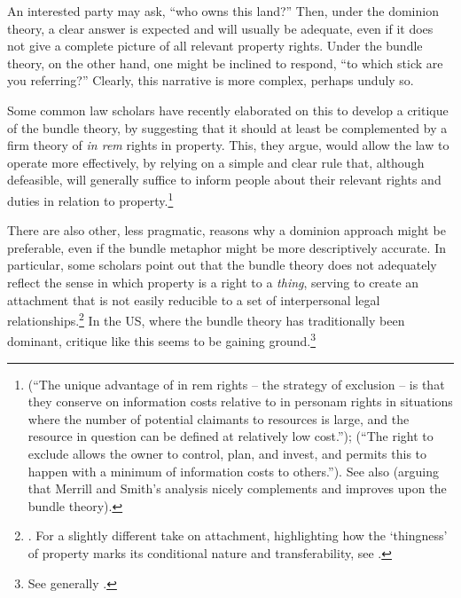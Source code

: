 An interested party may ask, ``who owns this land?'' Then, under the dominion theory, a clear answer is expected and will usually be adequate, even if it does not give a complete picture of all relevant property rights. Under the bundle theory, on the other hand, one might be inclined to respond, ``to which stick are you referring?'' Clearly, this narrative is more complex, perhaps unduly so. 

Some common law scholars have recently elaborated on this to develop a critique of the bundle theory, by suggesting that it should at least be complemented by a firm theory of {\it in rem} rights in property. This, they argue, would allow the law to operate more effectively, by relying on a simple and clear rule that, although defeasible, will generally suffice to inform people about their relevant rights and duties in relation to property.\footnote{\cite[793]{merrill01b} (``The unique advantage of in rem rights -- the strategy of exclusion -- is that they conserve on information costs relative to in personam rights in situations where the number of potential claimants to resources is large, and the resource in question can be defined at relatively low cost.''); \cite[389]{merrill01} (``The right to exclude allows the owner to control, plan, and invest, and permits this to happen with a minimum of information costs to others.''). See also \cite{ellickson11} (arguing that Merrill and Smith's analysis nicely complements and improves upon the bundle theory).} 

There are also other, less pragmatic, reasons why a dominion approach might be preferable, even if the bundle metaphor might be more descriptively accurate. In particular, some scholars point out that the bundle theory does not adequately reflect the sense in which property is a right to a {\it thing}, serving to create an attachment that is not easily reducible to a set of interpersonal legal relationships.\footnote{\cite[1862]{merrill07}. For a slightly different take on attachment, highlighting how the `thingness' of property marks its conditional nature and transferability, see \cite[799-818]{penner96}.} In the US, where the bundle theory has traditionally been dominant, critique like this seems to be gaining ground.\footnote{See generally \cite{foster10}.}

